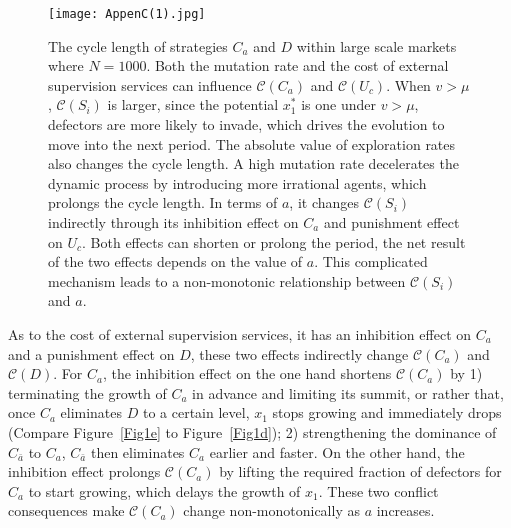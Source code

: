 \documentclass[letterpaper,10pt]{article}
\numberwithin{equation}{section}
\begin{document}
\begin{figure}[H]
    \begin{center}
        \texttt{[image: AppenC(1).jpg]}
    \end{center}
\caption{The cycle length of strategies $ C_{a} $ and $ D $ within large scale markets where $ N = 1000 $. Both the mutation rate and the cost of external supervision services can influence $ \mathscr{C}(C_{a}) $ and $ \mathscr{C}(U_{c}) $. When $ v > \mu $, $ \mathscr{C}(S_{i}) $ is larger, since the potential $ x_{1}^* $ is one under $ v > \mu $, defectors are more likely to invade, which drives the evolution to move into the next period. The absolute value of exploration rates also changes the cycle length. A high mutation rate decelerates the dynamic process by introducing more irrational agents, which prolongs the cycle length. In terms of $ a $, it changes $ \mathscr{C}(S_{i}) $ indirectly through its inhibition effect on $ C_{a} $ and punishment effect on $ U_{c} $. Both effects can shorten or prolong the period, the net result of the two effects depends on the value of $ a $. This complicated mechanism leads to a non-monotonic relationship between $ \mathscr{C}(S_{i}) $ and $ a $.} 
\label{AppenC31}
\end{figure}

As to the cost of external supervision services, it has an inhibition effect on $ C_{a} $ and a punishment effect on $ D $, these two effects indirectly change $ \mathscr{C}(C_{a}) $ and $ \mathscr{C}(D) $. For $ C_{a} $, the inhibition effect on the one hand shortens $ \mathscr{C}(C_{a}) $ by 1) terminating the growth of $ C_{a} $ in advance and limiting its summit, or rather that, once $ C_{a} $ eliminates $ D $ to a certain level, $ x_{1} $ stops growing and immediately drops (Compare Figure~\ref{Fig1e} to Figure~\ref{Fig1d}); 2) strengthening the dominance of $ C_{\bar{a}} $ to $ C_{a} $, $ C_{\bar{a}} $ then eliminates $ C_{a} $ earlier and faster. On the other hand, the inhibition effect prolongs $ \mathscr{C}(C_{a}) $ by lifting the required fraction of defectors for $ C_{a} $ to start growing, which delays the growth of $ x_{1} $. These two conflict consequences make $ \mathscr{C}(C_{a}) $ change non-monotonically as $ a $ increases.
\end{document}
